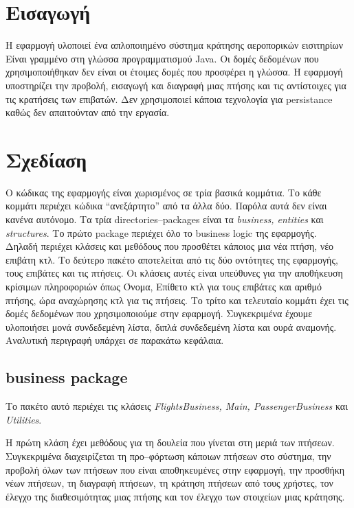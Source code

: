 \documentclass[a4paper]{article}
\begin{document}

\tableofcontents
\newpage
\section{Εισαγωγή}
Η εφαρμογή υλοποιεί ένα απλοποιημένο σύστημα κράτησης αεροπορικών εισιτηρίων
Είναι γραμμένο στη γλώσσα προγραμματισμού Java. Οι δομές δεδομένων που
χρησιμοποιήθηκαν δεν είναι οι έτοιμες δομές που προσφέρει η γλώσσα. Η εφαρμογή
υποστηρίζει την προβολή, εισαγωγή και διαγραφή μιας πτήσης και τις αντίστοιχες
για τις κρατήσεις των επιβατών. Δεν χρησιμοποιεί κάποια τεχνολογία για
persistance καθώς δεν απαιτούνταν από την εργασία.

\section{Σχεδίαση}
Ο κώδικας της εφαρμογής είναι χωρισμένος σε τρία βασικά κομμάτια. Το κάθε
κομμάτι περιέχει κώδικα ``ανεξάρτητο'' από τα άλλα δύο. Παρόλα αυτά δεν είναι
κανένα αυτόνομο. Τα τρία directories--packages είναι τα \emph{business,
entities} και \emph{structures}. Το πρώτο package περιέχει όλο το business logic
της εφαρμογής. Δηλαδή περιέχει κλάσεις και μεθόδους που προσθέτει κάποιος μια
νέα πτήση, νέο επιβάτη κτλ. Το δεύτερο πακέτο αποτελείται από τις δύο οντότητες
της εφαρμογής, τους επιβάτες και τις πτήσεις. Οι κλάσεις αυτές είναι υπεύθυνες
για την αποθήκευση κρίσιμων πληροφοριών όπως Όνομα, Επίθετο κτλ για τους
επιβάτες και αριθμό πτήσης, ώρα αναχώρησης κτλ για τις πτήσεις. Το τρίτο και
τελευταίο κομμάτι έχει τις δομές δεδομένων που χρησιμοποιούμε στην εφαρμογή.
Συγκεκριμένα έχουμε υλοποιήσει μονά συνδεδεμένη λίστα, διπλά συνδεδεμένη λίστα
και ουρά αναμονής. Αναλυτική περιγραφή υπάρχει σε παρακάτω κεφάλαια.


\subsection{business package}
Το πακέτο αυτό περιέχει τις κλάσεις \emph{FlightsBusiness, Main,
PassengerBusiness} και \emph{Utilities}.

Η πρώτη κλάση έχει μεθόδους για τη δουλεία που γίνεται στη μεριά των πτήσεων.
Συγκεκριμένα διαχειρίζεται τη προ--φόρτωση κάποιων πτήσεων στο σύστημα, την
προβολή όλων των πτήσεων που είναι αποθηκευμένες στην εφαρμογή, την προσθήκη
νέων πτήσεων, τη διαγραφή πτήσεων, τη κράτηση πτήσεων από τους χρήστες, τον
έλεγχο της διαθεσιμότητας μιας πτήσης και τον έλεγχο των στοιχείων μιας
κράτησης.
\end{document}
